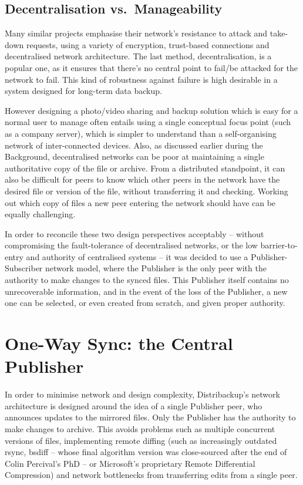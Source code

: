 \documentclass[12pt,a4paper,]{adreport}
\begin{document}
\subsection{Decentralisation
vs.~Manageability}\label{decentralisation-vs.manageability}

Many similar projects emphasise their network's resistance to attack and
take-down requests, using a variety of encryption, trust-based
connections and decentralised network architecture. The last method,
decentralisation, is a popular one, as it ensures that there's no
central point to fail/be attacked for the network to fail. This kind of
robustness against failure is high desirable in a system designed for
long-term data backup.

However designing a photo/video sharing and backup solution which is
easy for a normal user to manage often entails using a single conceptual
focus point (such as a company server), which is simpler to understand
than a self-organising network of inter-connected devices. Also, as
discussed earlier during the Background, decentralised networks can be
poor at maintaining a single authoritative copy of the file or archive.
From a distributed standpoint, it can also be difficult for peers to
know which other peers in the network have the desired file or version
of the file, without transferring it and checking. Working out which
copy of files a new peer entering the network should have can be equally
challenging.

In order to reconcile these two design perspectives acceptably --
without compromising the fault-tolerance of decentralised networks, or
the low barrier-to-entry and authority of centralised systems -- it was
decided to use a Publisher-Subscriber network model, where the Publisher
is the only peer with the authority to make changes to the synced files.
This Publisher itself contains no unrecoverable information, and in the
event of the loss of the Publisher, a new one can be selected, or even
created from scratch, and given proper authority.

\section{One-Way Sync: the Central
Publisher}\label{one-way-sync-the-central-publisher}

In order to minimise network and design complexity, Distribackup's
network architecture is designed around the idea of a single Publisher
peer, who announces updates to the mirrored files. Only the Publisher
has the authority to make changes to archive. This avoids problems such
as multiple concurrent versions of files, implementing remote diffing
(such as increasingly outdated rsync, bsdiff -- whose final algorithm
version was close-sourced after the end of Colin Percival's PhD -- or
Microsoft's proprietary Remote Differential Compression) and network
bottlenecks from transferring edits from a single peer.
\end{document}
